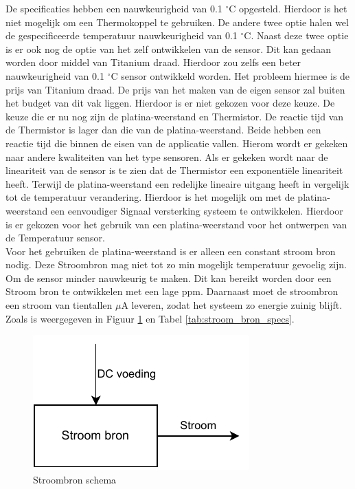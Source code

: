 De specificaties hebben een nauwkeurigheid van 0.1 $^\circ\text{C}$ opgesteld. Hierdoor is het niet mogelijk om een Thermokoppel te gebruiken. De andere twee optie halen wel de gespecificeerde temperatuur nauwkeurigheid van 0.1 $^\circ\text{C}$. Naast deze twee optie is er ook nog de optie van het zelf ontwikkelen van de sensor. Dit kan gedaan worden door middel van Titanium draad. Hierdoor zou zelfs een beter nauwkeurigheid van 0.1 $^\circ\text{C}$ sensor ontwikkeld worden. Het probleem hiermee is de prijs van Titanium draad. De prijs van het maken van de eigen sensor zal buiten het budget van dit vak liggen. Hierdoor is er niet gekozen voor deze keuze. De keuze die er nu nog zijn de platina-weerstand en Thermistor. De reactie tijd van de Thermistor is lager dan die van de platina-weerstand.  Beide hebben een reactie tijd die binnen de eisen van de applicatie vallen. Hierom wordt er gekeken naar andere kwaliteiten van het type sensoren. Als er gekeken wordt naar de lineariteit van de sensor is te zien dat de Thermistor een exponentiële lineariteit heeft. Terwijl de platina-weerstand een redelijke lineaire uitgang heeft in vergelijk tot de temperatuur verandering. Hierdoor is het mogelijk om met de platina-weerstand een eenvoudiger Signaal versterking systeem te ontwikkelen. Hierdoor is er gekozen voor het gebruik van een platina-weerstand voor het ontwerpen van de Temperatuur sensor.
\\
\newline
Voor het gebruiken de platina-weerstand is er alleen een constant stroom bron nodig. 
Deze Stroombron mag niet tot zo min mogelijk temperatuur gevoelig zijn. Om de sensor minder nauwkeurig te maken. Dit kan bereikt worden door een Stroom bron te ontwikkelen met een lage ppm. Daarnaast moet de stroombron een stroom van tientallen $\mu$A leveren, zodat het systeem zo energie zuinig blijft. Zoals is weergegeven in Figuur \ref{fig:Stroombron_schema} en Tabel \ref{tab:stroom_bron_specs}.

\begin{figure}[H]
    \centering
    \includegraphics[width=0.5\linewidth]{pictures/Stroombron.drawio.pdf}
    \caption{Stroombron schema}
    \label{fig:Stroombron_schema}
\end{figure}


